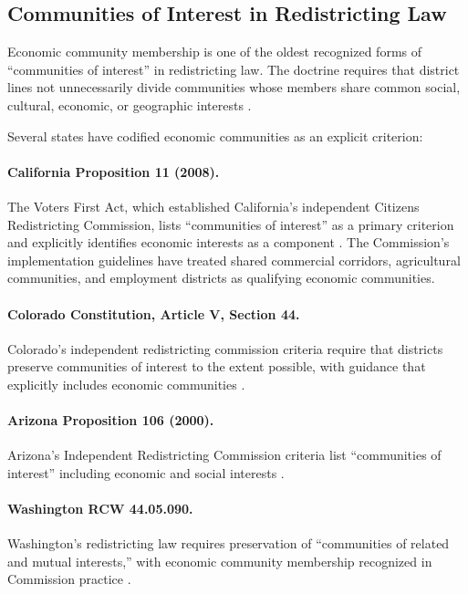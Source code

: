 \label{sec:legal}

\subsection{Communities of Interest in Redistricting Law}

Economic community membership is one of the oldest recognized forms of
``communities of interest'' in redistricting law.
The doctrine requires that district lines not unnecessarily divide
communities whose members share common social, cultural, economic, or
geographic interests \citep{ncsl2021criteria}.

Several states have codified economic communities as an explicit criterion:

\paragraph{California Proposition 11 (2008).}
The Voters First Act, which established California's independent Citizens
Redistricting Commission, lists ``communities of interest'' as a primary
criterion and explicitly identifies economic interests as a component
\citep{caprop11}.
The Commission's implementation guidelines have treated shared commercial
corridors, agricultural communities, and employment districts as qualifying
economic communities.

\paragraph{Colorado Constitution, Article V, Section 44.}
Colorado's independent redistricting commission criteria require that
districts preserve communities of interest to the extent possible, with
guidance that explicitly includes economic communities \citep{coart5s44}.

\paragraph{Arizona Proposition 106 (2000).}
Arizona's Independent Redistricting Commission criteria list
``communities of interest'' including economic and social interests \citep{azircprop106}.

\paragraph{Washington RCW 44.05.090.}
Washington's redistricting law requires preservation of ``communities of
related and mutual interests,'' with economic community membership
recognized in Commission practice \citep{warcw44}.

